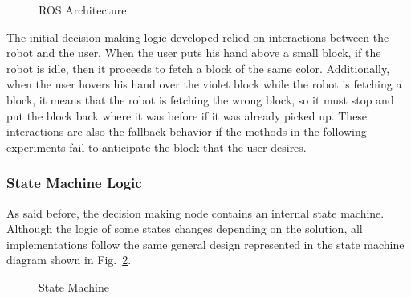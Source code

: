 \begin{figure}[!ht]%
    \centering
    
    \caption{ROS Architecture}
    \label{fig:ros_architecture}
\end{figure}

The initial decision-making logic developed relied on interactions between the robot and the user. When the user puts his hand above a small block, if the robot is idle, then it proceeds to fetch a block of the same color. Additionally, when the user hovers his hand over the violet block while the robot is fetching a block, it means that the robot is fetching the wrong block, so it must stop and put the block back where it was before if it was already picked up. These interactions are also the fallback behavior if the methods in the following experiments fail to anticipate the block that the user desires.

\subsubsection{State Machine Logic}

As said before, the decision making node contains an internal state machine. Although the logic of some states changes depending on the solution, all implementations follow the same general design represented in the state machine diagram shown in Fig.~\ref{fig:state_machine}.

\begin{figure}[!ht]%
    \centering
    
    \caption{State Machine}
    \label{fig:state_machine}
\end{figure}

